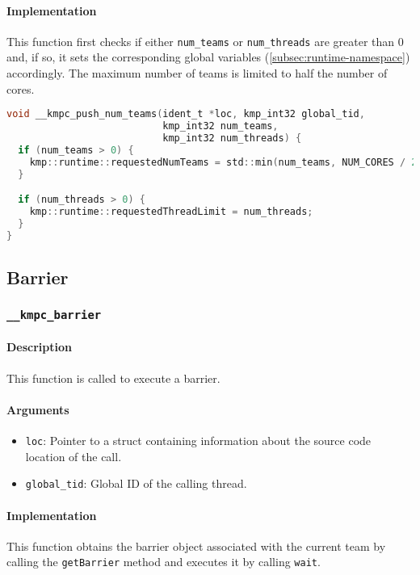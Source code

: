 \paragraph{Implementation} This function first checks if either \texttt{num\_teams} or
\texttt{num\_threads} are greater than 0 and, if so, it sets the corresponding global variables
(\cref{subsec:runtime-namespace}) accordingly. The maximum number of teams is limited to half the
number of cores.

\begin{lstlisting}[language=C, caption={__kmpc_push_num_teams}, label={lst:kmpc-push-num-teams}, escapechar=@]
void __kmpc_push_num_teams(ident_t *loc, kmp_int32 global_tid,
                           kmp_int32 num_teams,
                           kmp_int32 num_threads) {
  if (num_teams > 0) {
    kmp::runtime::requestedNumTeams = std::min(num_teams, NUM_CORES / 2);
  }

  if (num_threads > 0) {
    kmp::runtime::requestedThreadLimit = num_threads;
  }
}
\end{lstlisting}

\subsection{Barrier}

\subsubsection{\texttt{__kmpc_barrier}}
\label{subsubsec:kmpc-barrier}

\paragraph{Description} This function is called to execute a barrier.

\paragraph{Arguments}
\begin{itemize}
	\item \texttt{loc}: Pointer to a struct containing information about the source code location
	      of the call.
	\item \texttt{global\_tid}: Global ID of the calling thread.
\end{itemize}

\paragraph{Implementation} This function obtains the barrier object associated with the current team
by calling the \texttt{getBarrier} method and executes it by calling \texttt{wait}.

